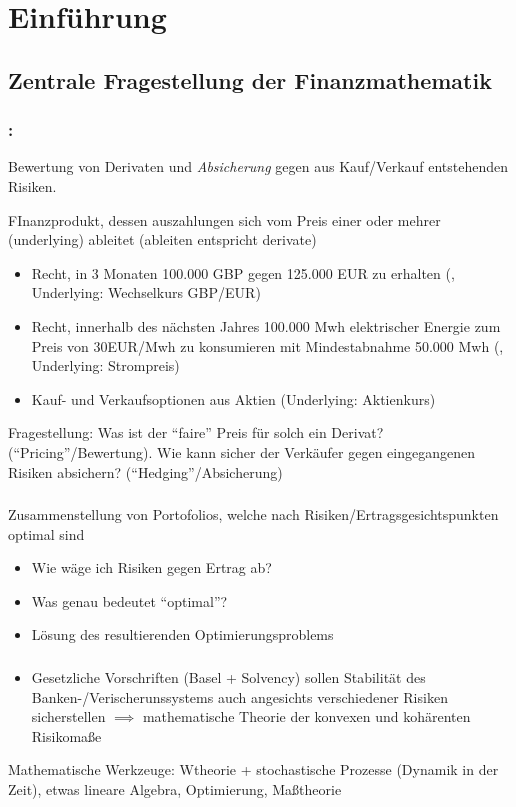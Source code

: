 \chapter{Einführung}
\section{Zentrale Fragestellung der Finanzmathematik}
\subsection*{:}
Bewertung von Derivaten und \emph{Absicherung} gegen aus Kauf/Verkauf entstehenden Risiken.

\begin{*definition}
	FInanzprodukt, dessen auszahlungen sich vom Preis einer oder mehrer  (underlying) ableitet (ableiten entspricht derivate)
\end{*definition}
\begin{*example}
	\begin{itemize}
		\item Recht, in 3 Monaten 100.000 GBP gegen 125.000 EUR zu erhalten (, Underlying: Wechselkurs GBP/EUR)
		\item Recht, innerhalb des nächsten Jahres 100.000 Mwh elektrischer Energie zum Preis von 30EUR/Mwh zu konsumieren mit Mindestabnahme 50.000 Mwh (, Underlying: Strompreis)
		\item Kauf- und Verkaufsoptionen aus Aktien (Underlying: Aktienkurs)
	\end{itemize}
\end{*example}
Fragestellung: Was ist der ``faire'' Preis für solch ein Derivat? (``Pricing''/Bewertung). Wie kann sicher der Verkäufer gegen eingegangenen Risiken absichern? (``Hedging''/Absicherung)
\subsection*{}
Zusammenstellung von Portofolios, welche nach Risiken/Ertragsgesichtspunkten optimal sind
\begin{itemize}
	\item Wie wäge ich Risiken gegen Ertrag ab?
	\item Was genau bedeutet ``optimal''?
	\item Lösung des resultierenden Optimierungsproblems
\end{itemize}
\subsection*{}
\begin{itemize}
	\item Gesetzliche Vorschriften (Basel + Solvency) sollen Stabilität des Banken-/Verischerunssystems auch angesichts verschiedener Risiken sicherstellen $\implies$ mathematische Theorie der konvexen und kohärenten Risikomaße
\end{itemize}
Mathematische Werkzeuge: Wtheorie + stochastische Prozesse (Dynamik in der Zeit), etwas lineare Algebra, Optimierung, Maßtheorie
